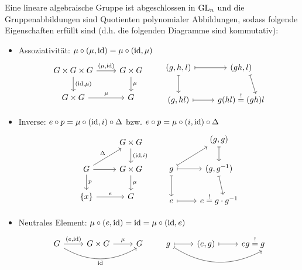 	Eine lineare algebraische Gruppe ist abgeschlossen in $\operatorname{GL}_n$ und die Gruppenabbildungen sind Quotienten polynomialer Abbildungen, sodass folgende Eigenschaften erfüllt sind (d.h. die folgenden Diagramme sind kommutativ):
	\begin{itemize}
		\item Assoziativität: $\mu \circ (\mu,\operatorname{id}) = \mu \circ (\operatorname{id},\mu)$
		\[ \begin{tikzcd}
		G \times G \times G \rar{(\mu,\id)} \dar{(\id,\mu)} & G \times G \dar{\mu} \\
		G \times G \rar{\mu} & G
		\end{tikzcd} \qquad	\begin{tikzcd}
		(g,h,l) \rar[mapsto] \dar[mapsto]& (gh, l) \arrow[d,end anchor={[xshift=-1.5em,yshift=-0.5em]north east},mapsto]\\
		(g, hl) \rar[mapsto] & g(hl) \stackrel{!}{=} (gh)l
		\end{tikzcd} \]
		\item Inverse: $e \circ p = \mu \circ (\operatorname{id},i) \circ \Delta$ bzw. $e \circ p = \mu \circ (i,\operatorname{id}) \circ \Delta$
		\[ \begin{tikzcd}
		\mbox{} & G \times G \dar{(\id, i)} \\
		G \rar \dar{p}  \urar{\Delta} & G \times G \dar{\mu} \\
		\{x\}  \rar{e} & G
		\end{tikzcd} \qquad	\begin{tikzcd}
		\mbox{} & (g,g) \dar[mapsto] \\
		g \rar[mapsto] \urar[mapsto] \dar[mapsto]& (g, g ^{-1}) \arrow[d,end anchor={[xshift=0.5em,yshift=-0.5em]},mapsto] \\
		e \rar[mapsto]& e \stackrel{!}{=} g \cdot g ^{-1}
		\end{tikzcd} \]
		\item Neutrales Element: $\mu \circ (e,\operatorname{id}) = \operatorname{id} = \mu \circ (\operatorname{id},e)$
		\[ \begin{tikzcd}
		G \rar{(e,\id)} \arrow[bend right, swap,end anchor={[xshift=0.5em]}]{rr}{\id} & G \times G \rar{\mu} &  G
		\end{tikzcd} \qquad \begin{tikzcd}
		g \rar[mapsto] \arrow[bend right,mapsto,end anchor={[xshift=2.5em]}]{rr} & (e,g) \rar[mapsto] & eg \stackrel{!}{=} g
		\end{tikzcd} \]
	\end{itemize}
	
